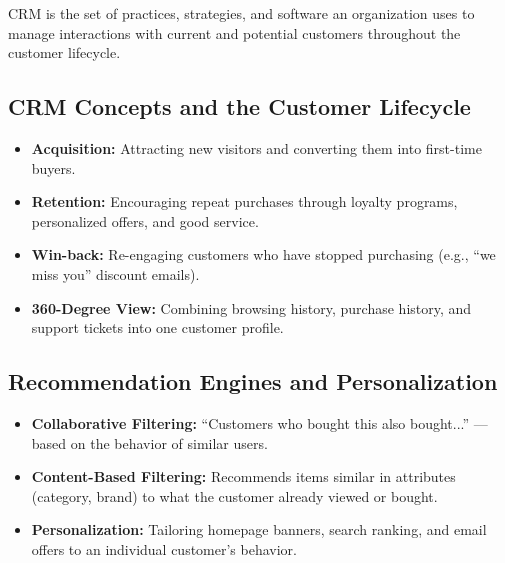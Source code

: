 \documentclass[11pt,a4paper]{article}
\begin{document}
\begin{definitionbox}
CRM is the set of practices, strategies, and software an organization uses to manage interactions with current and potential customers throughout the customer lifecycle.
\end{definitionbox}

\subsection{CRM Concepts and the Customer Lifecycle}
\begin{itemize}[leftmargin=*]
  \item \textbf{Acquisition:} Attracting new visitors and converting them into first-time buyers.
  \item \textbf{Retention:} Encouraging repeat purchases through loyalty programs, personalized offers, and good service.
  \item \textbf{Win-back:} Re-engaging customers who have stopped purchasing (e.g., ``we miss you'' discount emails).
  \item \textbf{360-Degree View:} Combining browsing history, purchase history, and support tickets into one customer profile.
\end{itemize}

\subsection{Recommendation Engines and Personalization}
\begin{conceptbox}
\begin{itemize}[leftmargin=*]
  \item \textbf{Collaborative Filtering:} ``Customers who bought this also bought...'' --- based on the behavior of similar users.
  \item \textbf{Content-Based Filtering:} Recommends items similar in attributes (category, brand) to what the customer already viewed or bought.
  \item \textbf{Personalization:} Tailoring homepage banners, search ranking, and email offers to an individual customer's behavior.
\end{itemize}
\end{conceptbox}
\end{document}
